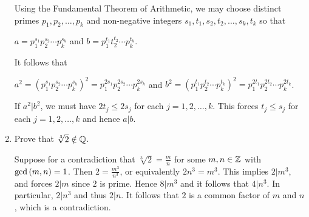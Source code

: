 \documentclass[11pt,fleqn,dvipsnames,usenames]{article}
\newcommand{\p}{\noindent}
\begin{document}
\begin{enumerate}
\solution Using the Fundamental Theorem of Arithmetic, we may choose distinct primes $p_{1},p_{2},\ldots, p_{k}$ and non-negative integers $s_{1},t_{1},s_{2},t_{2},\ldots,s_{k},t_{k}$ so that
\begin{center}
$a = p_{1}^{s_{1}}p_{2}^{s_{2}}\cdots p_{k}^{s_{k}}$ and $b = p_{1}^{t_{1}}t_{2}^{t_{2}}\cdots p_{k}^{t_{k}}$.
\end{center}
\p It follows that
\begin{center}
$a^2 = \left(p_{1}^{s_{1}}p_{2}^{s_{2}}\cdots p_{k}^{s_{k}}\right)^2 = p_{1}^{2s_{1}}p_{2}^{2s_{2}}\cdots p_{k}^{2s_{k}}$ and $b^2 = \left(p_{1}^{t_{1}}p_{2}^{t_{2}}\cdots p_{k}^{t_{k}}\right)^2 = p_{1}^{2t_{1}}p_{2}^{2t_{2}}\cdots p_{k}^{2t_{k}}$.
\end{center}
\p If $a^2|b^2$, we must have $2t_{j}\leq 2s_{j}$ for each $j=1,2,\ldots, k$.  This forces $t_{j}\leq s_{j}$ for each $j=1,2,\ldots, k$ and hence $a|b$.

\item Prove that $\sqrt[3]{2}\notin\mathbb{Q}$.
\vsmsp

\solution Suppose for a contradiction that $\sqrt[3]{2} = \frac{m}{n}$ for some $m,n\in\mathbb{Z}$ with $\text{gcd}\left(m,n\right)=1$.  Then $2 = \frac{m^3}{n^3}$, or equivalently $2n^3 = m^3$.  This implies $2|m^3$, and forces $2|m$ since $2$ is prime.  Hence $8|m^3$ and it follows that $4|n^3$.  In particular, $2|n^3$ and thus $2|n$.  It follows that $2$ is a common factor of $m$ and $n$, which is a contradiction.

\end{enumerate}
\end{document}

